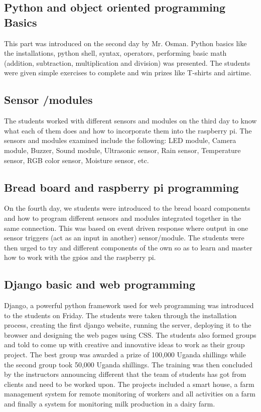 \documentclass{article}
\begin{document}
\subsection{Python and object oriented programming Basics}
This part was introduced on the second day by Mr. Osman. Python basics like the installations, python shell, syntax, operators, performing basic math (addition, subtraction, multiplication and division) was presented. The students were given simple exercises to complete and win prizes like T-shirts and airtime.
\subsection{Sensor /modules}
The students worked with different sensors and modules on the third day to know what each of them does and how to incorporate them into the raspberry pi. The sensors and modules examined include the following: LED module, Camera module, Buzzer, Sound module, Ultrasonic sensor, Rain sensor, Temperature sensor, RGB color sensor, Moisture sensor, etc.
\subsection{Bread board and raspberry pi programming}
On the fourth day, we students were introduced to the bread board components and how to program different sensors and modules integrated together in the same connection. This was based on event driven response where output in one sensor triggers (act as an input in another) sensor/module.
The students were then urged to try and different components of the own so as to learn and master how to work with the gpios and the raspberry pi.
\subsection{Django basic and web programming}
Django, a powerful python framework used for web programming was introduced to the students on Friday. The students were taken through the installation process, creating the first django website, running the server, deploying it to the browser and designing the web pages using CSS.
The students also formed groups and told to come up with creative and innovative ideas to work as their group project. The best group was awarded a prize of 100,000 Uganda shillings while the second group took 50,000 Uganda shillings.
The training was then concluded by the instructors announcing different that the team of students has got from clients and need to be worked upon. The projects included a smart house, a farm management system for remote monitoring of workers and all activities on a farm and finally a system for monitoring milk production in a dairy farm.
\end{document}
